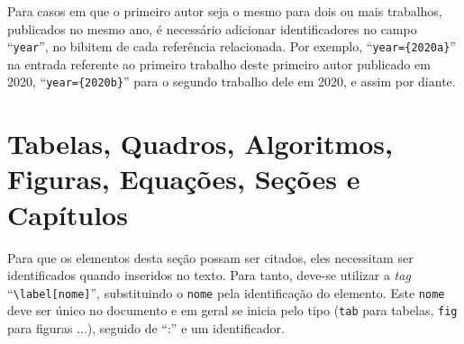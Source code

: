 Para casos em que o primeiro autor seja o mesmo para dois ou mais trabalhos, publicados no mesmo ano, é necessário adicionar identificadores no campo ``\texttt{year}'', no bibitem de cada referência relacionada. Por exemplo, ``\texttt{year=\{2020a\}}'' na entrada referente ao primeiro trabalho deste primeiro autor publicado em 2020, ``\texttt{year=\{2020b\}}'' para o segundo trabalho dele em 2020, e assim por diante.
\\
\section{Tabelas, Quadros, Algoritmos, Figuras, Equações, Seções e Capítulos}

Para que os elementos desta seção possam ser citados, eles necessitam ser identificados quando inseridos no texto. Para tanto, deve-se utilizar a \textit{tag} ``\texttt{\textbackslash label[nome]}'', substituindo o \texttt{nome} pela identificação do elemento. Este \texttt{nome} deve ser único no documento e em geral se inicia pelo tipo (\texttt{tab} para tabelas, \texttt{fig} para figuras ...), seguido de ``:'' e um identificador.

